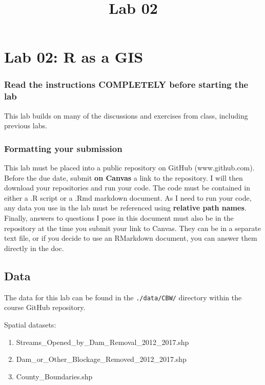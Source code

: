 \documentclass[]{article}
\title{Lab 02}
\author{}
\date{}
\makeatletter
\renewcommand{\maketitle}{\bgroup\vspace*{-1cm}\setlength{\parindent}{0pt}
\begin{flushleft}
  \@author
  
  \@date
  
\end{flushleft}\egroup
}
\makeatother
\begin{document}
\maketitle

\hypertarget{lab-02-r-as-a-gis}{%
\section{Lab 02: R as a GIS}\label{lab-02-r-as-a-gis}}

\hypertarget{read-the-instructions-completely-before-starting-the-lab}{%
\subsubsection{Read the instructions COMPLETELY before starting the
lab}\label{read-the-instructions-completely-before-starting-the-lab}}

This lab builds on many of the discussions and exercises from class,
including previous labs.

\hypertarget{formatting-your-submission}{%
\subsubsection{Formatting your
submission}\label{formatting-your-submission}}

This lab must be placed into a public repository on GitHub
(www.github.com). Before the due date, submit \textbf{on Canvas} a link
to the repository. I will then download your repositories and run your
code. The code must be contained in either a .R script or a .Rmd
markdown document. As I need to run your code, any data you use in the
lab must be referenced using \textbf{relative path names}. Finally,
answers to questions I pose in this document must also be in the
repository at the time you submit your link to Canvas. They can be in a
separate text file, or if you decide to use an RMarkdown document, you
can answer them directly in the doc.

\hypertarget{data}{%
\subsection{Data}\label{data}}

The data for this lab can be found in the \texttt{./data/CBW/} directory
within the course GitHub repository.

Spatial datasets:

\begin{enumerate}
\def\labelenumi{\arabic{enumi}.}
\item
  Streams\_Opened\_by\_Dam\_Removal\_2012\_2017.shp
\item
  Dam\_or\_Other\_Blockage\_Removed\_2012\_2017.shp
\item
  County\_Boundaries.shp
\end{enumerate}
\end{document}
